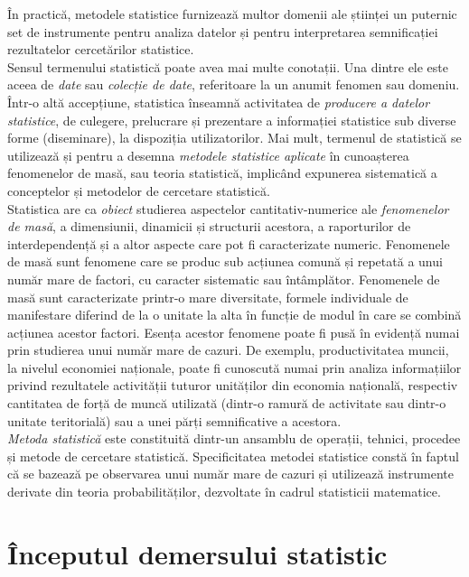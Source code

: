 \documentclass[
  11pt,
  b5paper,
  nottoc]{book}
\begin{document}
În practică, metodele statistice furnizează multor domenii ale științei
un puternic set de instrumente pentru analiza datelor și pentru
interpretarea semnificației rezultatelor cercetărilor statistice.\\
Sensul termenului statistică poate avea mai multe conotații. Una dintre
ele este aceea de \emph{date} sau \emph{colecție de date}, referitoare
la un anumit fenomen sau domeniu. Într-o altă accepțiune, statistica
înseamnă activitatea de \emph{producere a datelor statistice}, de
culegere, prelucrare și prezentare a informației statistice sub diverse
forme (diseminare), la dispoziția utilizatorilor. Mai mult, termenul de
statistică se utilizează și pentru a desemna \emph{metodele statistice
aplicate} în cunoașterea fenomenelor de masă, sau teoria statistică,
implicând expunerea sistematică a conceptelor și metodelor de cercetare
statistică.\\
Statistica are ca \emph{obiect} studierea aspectelor cantitativ-numerice
ale \emph{fenomenelor de masă}, a dimensiunii, dinamicii și structurii
acestora, a raporturilor de interdependență și a altor aspecte care pot
fi caracterizate numeric. Fenomenele de masă sunt fenomene care se
produc sub acțiunea comună și repetată a unui număr mare de factori, cu
caracter sistematic sau întâmplător. Fenomenele de masă sunt
caracterizate printr-o mare diversitate, formele individuale de
manifestare diferind de la o unitate la alta în funcție de modul în care
se combină acțiunea acestor factori. Esența acestor fenomene poate fi
pusă în evidență numai prin studierea unui număr mare de cazuri. De
exemplu, productivitatea muncii, la nivelul economiei naționale, poate
fi cunoscută numai prin analiza informațiilor privind rezultatele
activității tuturor unităților din economia națională, respectiv
cantitatea de forță de muncă utilizată (dintr-o ramură de activitate sau
dintr-o unitate teritorială) sau a unei părți semnificative a
acestora.\\
\emph{Metoda statistică} este constituită dintr-un ansamblu de operații,
tehnici, procedee și metode de cercetare statistică. Specificitatea
metodei statistice constă în faptul că se bazează pe observarea unui
număr mare de cazuri și utilizează instrumente derivate din teoria
probabilităților, dezvoltate în cadrul statisticii matematice.

\hypertarget{uxeenceputul-demersului-statistic}{%
\section{Începutul demersului
statistic}\label{uxeenceputul-demersului-statistic}}
\end{document}
